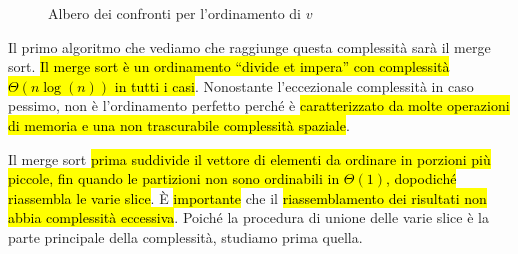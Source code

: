 \documentclass[a4paper,11pt,oneside]{article}
\theoremstyle{plain}
\theoremstyle{definition}
\theoremstyle{remark}
\begin{document}
\begin{figure}[htb]
  \centering
  \caption{Albero dei confronti per l'ordinamento di $v$}%
  \label{fig:albero-confronti}
\end{figure}

Il primo algoritmo che vediamo che raggiunge questa complessità sarà il merge
sort. \hl{Il merge sort è un ordinamento ``divide et impera'' con complessità
$\Theta(n\log(n))$ in tutti i casi}. Nonostante l'eccezionale complessità in
caso pessimo, non è l'ordinamento perfetto perché è \hl{caratterizzato da molte
operazioni di memoria e una non trascurabile complessità spaziale}.

Il merge sort \hl{prima suddivide il vettore di elementi da ordinare in porzioni più
piccole, fin quando le partizioni non sono ordinabili in $\Theta(1)$, dopodiché
riassembla le varie slice}. È \hl{importante} che il \hl{riassemblamento dei risultati non
abbia complessità eccessiva}. Poiché la procedura di unione delle varie slice
è la parte principale della complessità, studiamo prima quella.
\end{document}

